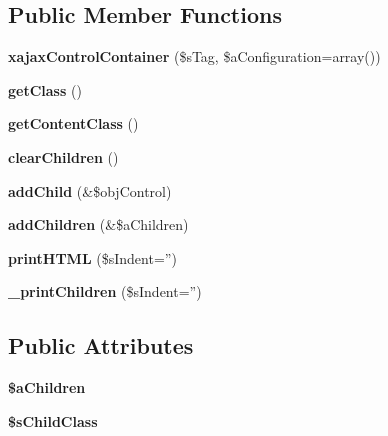 \subsection*{Public Member Functions}
\begin{DoxyCompactItemize}
\item 
\hypertarget{classxajaxControlContainer_a73dfd96abf86a661ed5bd4abfee38ff8}{
{\bfseries xajaxControlContainer} (\$sTag, \$aConfiguration=array())}
\label{classxajaxControlContainer_a73dfd96abf86a661ed5bd4abfee38ff8}

\item 
\hypertarget{classxajaxControlContainer_ab4a7a20e5b3cfe329eaaccdbace46f1f}{
{\bfseries getClass} ()}
\label{classxajaxControlContainer_ab4a7a20e5b3cfe329eaaccdbace46f1f}

\item 
\hypertarget{classxajaxControlContainer_a066d720f6fb473db64453e6eeaee0d4c}{
{\bfseries getContentClass} ()}
\label{classxajaxControlContainer_a066d720f6fb473db64453e6eeaee0d4c}

\item 
\hypertarget{classxajaxControlContainer_a4195fd90549204db5620d7e1e1da2b10}{
{\bfseries clearChildren} ()}
\label{classxajaxControlContainer_a4195fd90549204db5620d7e1e1da2b10}

\item 
\hypertarget{classxajaxControlContainer_a742d872eb7e27c4c8efdfb796a94f1fc}{
{\bfseries addChild} (\&\$objControl)}
\label{classxajaxControlContainer_a742d872eb7e27c4c8efdfb796a94f1fc}

\item 
\hypertarget{classxajaxControlContainer_ae11b921f380a818522f99b71ad196f31}{
{\bfseries addChildren} (\&\$aChildren)}
\label{classxajaxControlContainer_ae11b921f380a818522f99b71ad196f31}

\item 
\hypertarget{classxajaxControlContainer_a96bed837153474bca44b653322b3dd4d}{
{\bfseries printHTML} (\$sIndent='')}
\label{classxajaxControlContainer_a96bed837153474bca44b653322b3dd4d}

\item 
\hypertarget{classxajaxControlContainer_a69a928b454cf5d02985194977938749a}{
{\bfseries \_\-printChildren} (\$sIndent='')}
\label{classxajaxControlContainer_a69a928b454cf5d02985194977938749a}

\end{DoxyCompactItemize}
\subsection*{Public Attributes}
\begin{DoxyCompactItemize}
\item 
\hypertarget{classxajaxControlContainer_a43fe69fd73e8dd18a306bc80498d9bcd}{
{\bfseries \$aChildren}}
\label{classxajaxControlContainer_a43fe69fd73e8dd18a306bc80498d9bcd}

\item 
\hypertarget{classxajaxControlContainer_a198e3f7488f89b13ea0be4156d7d6a91}{
{\bfseries \$sChildClass}}
\label{classxajaxControlContainer_a198e3f7488f89b13ea0be4156d7d6a91}

\end{DoxyCompactItemize}


